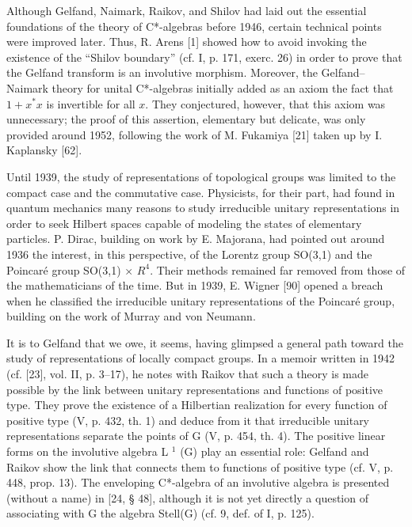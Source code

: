 Although Gelfand, Naimark, Raikov, and Shilov had laid out the essential foundations of the theory of C*-algebras before 1946, certain technical points were improved later. Thus, R. Arens {[}1{]} showed how to avoid invoking the existence of the “Shilov boundary” (cf. I, p. 171, exerc. 26) in order to prove that the Gelfand transform is an involutive morphism. Moreover, the Gelfand–Naimark theory for unital C*-algebras initially added as an axiom the fact that \(1 + x^{*}x\) is invertible for all \(x\). They conjectured, however, that this axiom was unnecessary; the proof of this assertion, elementary but delicate, was only provided around 1952, following the work of M. Fukamiya {[}21{]} taken up by I. Kaplansky {[}62{]}.


Until 1939, the study of representations of topological groups was limited to the compact case and the commutative case. Physicists, for their part, had found in quantum mechanics many reasons to study irreducible unitary representations in order to seek Hilbert spaces capable of modeling the states of elementary particles. P. Dirac, building on work by E. Majorana, had pointed out around 1936 the interest, in this perspective, of the Lorentz group SO(3,1) and the Poincaré group SO(3,1) × \(R^{4}\). Their methods remained far removed from those of the mathematicians of the time. But in 1939, E. Wigner {[}90{]} opened a breach when he classified the irreducible unitary representations of the Poincaré group, building on the work of Murray and von Neumann.

It is to Gelfand that we owe, it seems, having glimpsed a general path toward the study of representations of locally compact groups. In a memoir written in 1942 (cf. {[}23{]}, vol. II, p. 3--17), he notes with Raikov that such a theory is made possible by the link between unitary representations and functions of positive type. They prove the existence of a Hilbertian realization for every function of positive type (V, p. 432, th. 1) and deduce from it that irreducible unitary representations separate the points of G (V, p. 454, th. 4). The positive linear forms on the involutive algebra L \(^{1}\) (G) play an essential role: Gelfand and Raikov show the link that connects them to functions of positive type (cf. V, p. 448, prop. 13). The enveloping C*-algebra of an involutive algebra is presented (without a name) in {[}24, § 48{]}, although it is not yet directly a question of associating with G the algebra Stell(G) (cf. 9, def. of I, p. 125).

